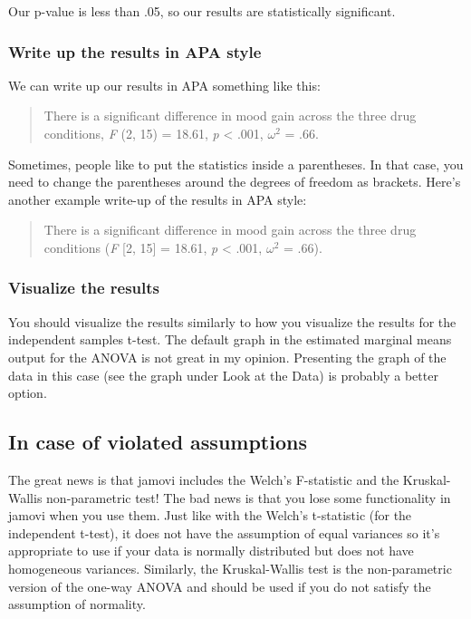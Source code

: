 \documentclass[
]{book}
\begin{document}
Our p-value is less than .05, so our results are statistically significant.

\hypertarget{write-up-the-results-in-apa-style-6}{%
\subsubsection{Write up the results in APA style}\label{write-up-the-results-in-apa-style-6}}

We can write up our results in APA something like this:

\begin{quote}
There is a significant difference in mood gain across the three drug conditions, \emph{F} (2, 15) = 18.61, \emph{p} \textless{} .001, \(\omega^2\) = .66.
\end{quote}

Sometimes, people like to put the statistics inside a parentheses. In that case, you need to change the parentheses around the degrees of freedom as brackets. Here's another example write-up of the results in APA style:

\begin{quote}
There is a significant difference in mood gain across the three drug conditions (\emph{F} {[}2, 15{]} = 18.61, \emph{p} \textless{} .001, \(\omega^2\) = .66).
\end{quote}

\hypertarget{visualize-the-results-5}{%
\subsubsection{Visualize the results}\label{visualize-the-results-5}}

You should visualize the results similarly to how you visualize the results for the independent samples t-test. The default graph in the estimated marginal means output for the ANOVA is not great in my opinion. Presenting the graph of the data in this case (see the graph under Look at the Data) is probably a better option.

\hypertarget{in-case-of-violated-assumptions-4}{%
\subsection{In case of violated assumptions}\label{in-case-of-violated-assumptions-4}}

The great news is that jamovi includes the Welch's F-statistic and the Kruskal-Wallis non-parametric test! The bad news is that you lose some functionality in jamovi when you use them. Just like with the Welch's t-statistic (for the independent t-test), it does not have the assumption of equal variances so it's appropriate to use if your data is normally distributed but does not have homogeneous variances. Similarly, the Kruskal-Wallis test is the non-parametric version of the one-way ANOVA and should be used if you do not satisfy the assumption of normality.
\end{document}
